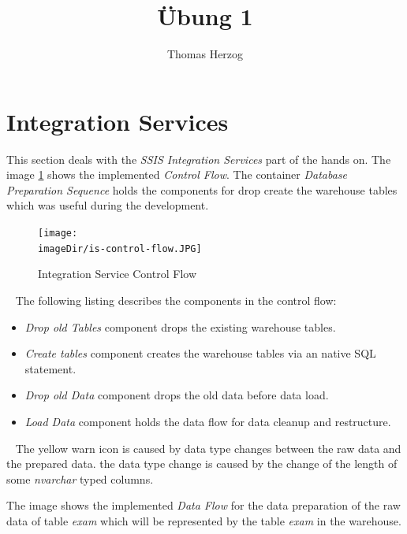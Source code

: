 \documentclass[11pt, a4paper, twoside]{article}   	%
\title{Übung 1}
\author{Thomas Herzog}
\newcommand{\imageDir}{./images/}
\begin{document}
\setlength{\headheight}{15mm}
%

\section{Integration Services}
\label{sec:integration-services}
This section deals with the \emph{SSIS Integration Services} part of the hands on. The image \ref{fig:is-control-flow} shows the implemented \emph{Control Flow}. The container \emph{Database Preparation Sequence} holds the components for drop create the warehouse tables which was useful during the development.

\begin{figure}[h]
\centering
\texttt{[image: \\imageDir/is-control-flow.JPG]}
\caption{Integration Service Control Flow}
\label{fig:is-control-flow}
\end{figure}
\ \newline
The following listing describes the components in the control flow:
\begin{itemize}
	\item \emph{Drop old Tables} component drops the existing warehouse tables.
	\item \emph{Create tables} component creates the warehouse tables via an native SQL statement.
	\item \emph{Drop old Data} component drops the old data before data load.
	\item \emph{Load Data} component holds the data flow for data cleanup and restructure.
\end{itemize}
\ \newline
The yellow warn icon is caused by data type changes between the raw data and the prepared data. the data type change is caused by the change of the length of some \emph{nvarchar} typed columns.
\newpage

The image shows the implemented \emph{Data Flow} for the data preparation of the raw data of table \emph{exam} which will be represented by the table \emph{exam} in the warehouse.
\end{document}
